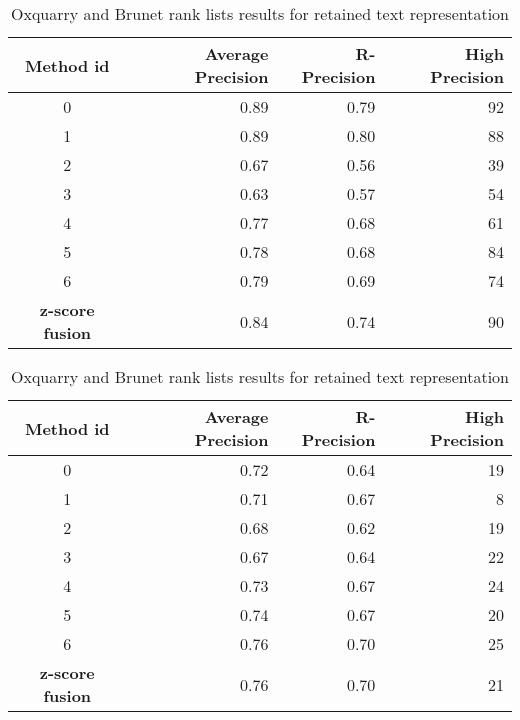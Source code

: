 \begin{table}[H]
  \centering
  \caption{Oxquarry and Brunet rank lists results for retained text representation}
  \label{tab:9rl_results_brunet_oxquarry}

  \begin{tabular}{c r r r}
    \toprule
    Method id &
    Average Precision &
    R-Precision &
    High Precision \\
    \midrule
    0 & 0.89 & 0.79 & 92 \\
    1 & 0.89 & 0.80 & 88 \\
    2 & 0.67 & 0.56 & 39 \\
    3 & 0.63 & 0.57 & 54 \\
    4 & 0.77 & 0.68 & 61 \\
    5 & 0.78 & 0.68 & 84 \\
    6 & 0.79 & 0.69 & 74 \\
    \textbf{z-score fusion} &  0.84 & 0.74 & 90 \\
    \bottomrule
  \end{tabular}

  \begin{tabular}{c r r r}
    \toprule
    Method id &
    Average Precision &
    R-Precision &
    High Precision \\
    \midrule
    0 & 0.72 & 0.64 & 19 \\
    1 & 0.71 & 0.67 &  8 \\
    2 & 0.68 & 0.62 & 19 \\
    3 & 0.67 & 0.64 & 22 \\
    4 & 0.73 & 0.67 & 24 \\
    5 & 0.74 & 0.67 & 20 \\
    6 & 0.76 & 0.70 & 25 \\
    \textbf{z-score fusion} & 0.76 &  0.70 & 21 \\
    \bottomrule
  \end{tabular}

\end{table}


